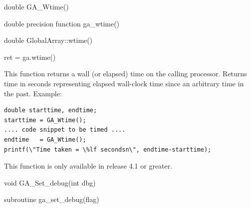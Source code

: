 \documentclass[10pt]{article}
\begin{document}


\begin{capi}
\begin{ccode}
double GA_Wtime()
\end{ccode}
\end{capi}

\begin{fapi}
\begin{fcode}
double precision function ga_wtime()
\end{fcode}
\end{fapi}

\begin{cxxapi}
\begin{cxxcode}
double GlobalArray::wtime()
\end{cxxcode}
\end{cxxapi}

\begin{pyapi}
\begin{pycode}
ret = ga.wtime()
\end{pycode}
\end{pyapi}

\local

\begin{desc}
This function returns a wall (or elapsed) time on the calling processor.
Returns time in seconds representing elapsed wall-clock time since an arbitrary
time in the past. Example:
\begin{verbatim}
double starttime, endtime;
starttime = GA_Wtime();
.... code snippet to be timed ....
endtime   = GA_Wtime();
printf(\"Time taken = \%lf secondsn\", endtime-starttime);
\end{verbatim}
This function is only available in release 4.1 or greater.
\end{desc}



\begin{capi}
\begin{ccode}
void GA_Set_debug(int dbg)
\end{ccode}
\begin{funcargs}
\end{funcargs}
\end{capi}

\begin{fapi}
\begin{fcode}
subroutine ga_set_debug(flag)
\end{fcode}
\begin{funcargs}
\end{funcargs}
\end{fapi}
\end{document}
